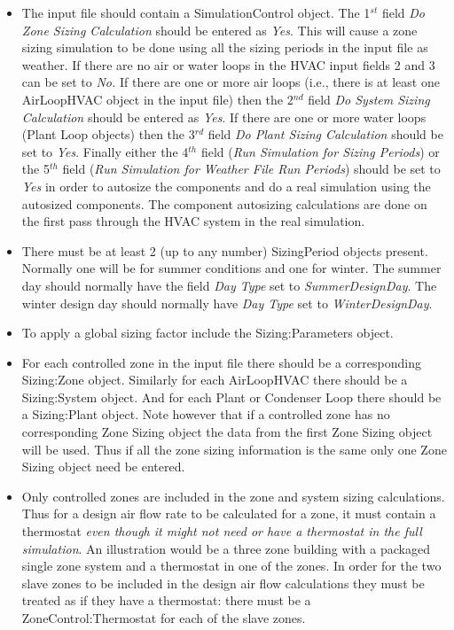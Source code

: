 \begin{itemize}
\item
  The input file should contain a SimulationControl object. The 1\(^{st}\) field \emph{Do Zone Sizing Calculation} should be entered as \emph{Yes}. This will cause a zone sizing simulation to be done using all the sizing periods in the input file as weather. If there are no air or water loops in the HVAC input fields 2 and 3 can be set to \emph{No.} If there are one or more air loops (i.e., there is at least one AirLoopHVAC object in the input file) then the 2\(^{nd}\) field \emph{Do System Sizing Calculation} should be entered as \emph{Yes}. If there are one or more water loops (Plant Loop objects) then the 3\(^{rd}\) field \emph{Do Plant Sizing Calculation} should be set to \emph{Yes}. Finally either the 4\(^{th}\) field (\emph{Run Simulation for Sizing Periods}) or the 5\(^{th}\) field (\emph{Run Simulation for Weather File Run Periods}) should be set to \emph{Yes} in order to autosize the components and do a real simulation using the autosized components. The component autosizing calculations are done on the first pass through the HVAC system in the real simulation.
\item
  There must be at least 2 (up to any number) SizingPeriod objects present. Normally one will be for summer conditions and one for winter. The summer day should normally have the field \emph{Day Type} set to \emph{SummerDesignDay}. The winter design day should normally have \emph{Day Type} set to \emph{WinterDesignDay}.
\item
  To apply a global sizing factor include the Sizing:Parameters object.
\item
  For each controlled zone in the input file there should be a corresponding Sizing:Zone object. Similarly for each AirLoopHVAC there should be a Sizing:System object. And for each Plant or Condenser Loop there should be a Sizing:Plant object. Note however that if a controlled zone has no corresponding Zone Sizing object the data from the first Zone Sizing object will be used. Thus if all the zone sizing information is the same only one Zone Sizing object need be entered.
\item
  Only controlled zones are included in the zone and system sizing calculations. Thus for a design air flow rate to be calculated for a zone, it must contain a thermostat \emph{even though it might not need or have a thermostat in the full simulation}. An illustration would be a three zone building with a packaged single zone system and a thermostat in one of the zones. In order for the two slave zones to be included in the design air flow calculations they must be treated as if they have a thermostat: there must be a ZoneControl:Thermostat for each of the slave zones.

\end{itemize}
